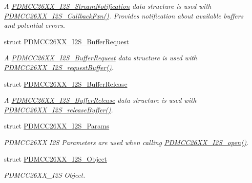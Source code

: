 \begin{DoxyCompactItemize}
\begin{DoxyCompactList}\small\item\em A \hyperlink{struct_p_d_m_c_c26_x_x___i2_s___stream_notification}{P\+D\+M\+C\+C26\+X\+X\+\_\+\+I2\+S\+\_\+\+Stream\+Notification} data structure is used with \hyperlink{_p_d_m_c_c26_x_x__util_8h_a82786f08d1b22895c79dcd8880fb92f3}{P\+D\+M\+C\+C26\+X\+X\+\_\+\+I2\+S\+\_\+\+Callback\+Fxn()}. Provides notification about available buffers and potential errors. \end{DoxyCompactList}\item 
struct \hyperlink{struct_p_d_m_c_c26_x_x___i2_s___buffer_request}{P\+D\+M\+C\+C26\+X\+X\+\_\+\+I2\+S\+\_\+\+Buffer\+Request}
\begin{DoxyCompactList}\small\item\em A \hyperlink{struct_p_d_m_c_c26_x_x___i2_s___buffer_request}{P\+D\+M\+C\+C26\+X\+X\+\_\+\+I2\+S\+\_\+\+Buffer\+Request} data structure is used with \hyperlink{_p_d_m_c_c26_x_x__util_8h_a69561b9a6f07a82bfe3b18f3c51fcd19}{P\+D\+M\+C\+C26\+X\+X\+\_\+\+I2\+S\+\_\+request\+Buffer()}. \end{DoxyCompactList}\item 
struct \hyperlink{struct_p_d_m_c_c26_x_x___i2_s___buffer_release}{P\+D\+M\+C\+C26\+X\+X\+\_\+\+I2\+S\+\_\+\+Buffer\+Release}
\begin{DoxyCompactList}\small\item\em A \hyperlink{struct_p_d_m_c_c26_x_x___i2_s___buffer_release}{P\+D\+M\+C\+C26\+X\+X\+\_\+\+I2\+S\+\_\+\+Buffer\+Release} data structure is used with \hyperlink{_p_d_m_c_c26_x_x__util_8h_ae6436840c3944258d3bdf041250dd10c}{P\+D\+M\+C\+C26\+X\+X\+\_\+\+I2\+S\+\_\+release\+Buffer()}. \end{DoxyCompactList}\item 
struct \hyperlink{struct_p_d_m_c_c26_x_x___i2_s___params}{P\+D\+M\+C\+C26\+X\+X\+\_\+\+I2\+S\+\_\+\+Params}
\begin{DoxyCompactList}\small\item\em P\+D\+M\+C\+C26\+X\+X I2\+S Parameters are used when calling \hyperlink{_p_d_m_c_c26_x_x__util_8h_a8168bcdab9f1e46c26823555df6f797f}{P\+D\+M\+C\+C26\+X\+X\+\_\+\+I2\+S\+\_\+open()}. \end{DoxyCompactList}\item 
struct \hyperlink{struct_p_d_m_c_c26_x_x___i2_s___object}{P\+D\+M\+C\+C26\+X\+X\+\_\+\+I2\+S\+\_\+\+Object}
\begin{DoxyCompactList}\small\item\em P\+D\+M\+C\+C26\+X\+X\+\_\+\+I2\+S Object. \end{DoxyCompactList}\end{DoxyCompactItemize}
